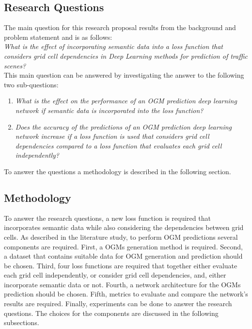 \subsection{Research Questions} \label{subsec:rp_questions}
The main question for this research proposal results from the background and problem statement and is as follows: \\
\textit{What is the effect of incorporating semantic data into a loss function that considers grid cell dependencies in Deep Learning methods for  prediction of traffic scenes?} \\

This main question can be answered by investigating the answer to the following two sub-questions:

\begin{enumerate}
	\item \textit{What is the effect on the performance of an \gls{OGM} prediction deep learning network if semantic data is incorporated into the loss function?}
	\item \textit{Does the accuracy of the predictions of an \gls{OGM} prediction deep learning network increase if a loss function is used that considers grid cell dependencies compared to a loss function that evaluates each grid cell independently?}
\end{enumerate}

To answer the questions a methodology is described in the following section.

\subsection{Methodology}  \label{subsec:rp_methodology}
To answer the research questions, a new loss function is required that incorporates semantic data while also considering the dependencies between grid cells. As described in the literature study, to perform \gls{OGM} predictions several components are required. First, a \glspl{OGM} generation method is required. Second, a dataset that contains suitable data for \gls{OGM} generation and prediction should be chosen. Third, four loss functions are required that together either evaluate each grid cell independently, or consider grid cell dependencies, and, either incorporate semantic data or not. Fourth, a network architecture for the \glspl{OGM} prediction should be chosen. Fifth, metrics to evaluate and compare the network's results are required. Finally, experiments can be done to answer the research questions. The choices for the components are discussed in the following subsections. 

